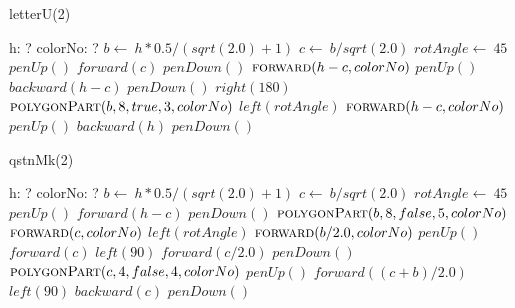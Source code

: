 \documentclass[a4paper,10pt]{article}
\begin{document}
\begin{algorithm}
\caption{letterU(2)}
\begin{algorithmic}[5]
\State {}
\State {}
    \State h: ?
    \State colorNo: ?
  \EndDecl
  \State \(b\gets\ h*0.5/(sqrt(2.0)+1)\)
  \State \(c\gets\ b/sqrt(2.0)\)
  \State \(rotAngle\gets\ 45\)
  \State \(penUp()\)
  \State \(forward(c)\)
  \State \(penDown()\)
  \State \(\Call{forward}{h-c,colorNo}\)
  \State \(penUp()\)
  \State \(backward(h-c)\)
  \State \(penDown()\)
  \State \(right(180)\)
  \State \(\Call{polygonPart}{b,8,true,3,colorNo}\)
  \State \(left(rotAngle)\)
  \State \(\Call{forward}{h-c,colorNo}\)
  \State \(penUp()\)
  \State \(backward(h)\)
  \State \(penDown()\)
\EndProcedure
\end{algorithmic}
\end{algorithm}


\begin{algorithm}
\caption{qstnMk(2)}
\begin{algorithmic}[5]
\State {}
\State {}
    \State h: ?
    \State colorNo: ?
  \EndDecl
  \State \(b\gets\ h*0.5/(sqrt(2.0)+1)\)
  \State \(c\gets\ b/sqrt(2.0)\)
  \State \(rotAngle\gets\ 45\)
  \State \(penUp()\)
  \State \(forward(h-c)\)
  \State \(penDown()\)
  \State {}
  \State {}
  \State \(\Call{polygonPart}{b,8,false,5,colorNo}\)
  \State \(\Call{forward}{c,colorNo}\)
  \State \(left(rotAngle)\)
  \State \(\Call{forward}{b/2.0,colorNo}\)
  \State \(penUp()\)
  \State \(forward(c)\)
  \State \(left(90)\)
  \State \(forward(c/2.0)\)
  \State \(penDown()\)
  \State {}
  \State {}
  \State \(\Call{polygonPart}{c,4,false,4,colorNo}\)
  \State \(penUp()\)
  \State \(forward((c+b)/2.0)\)
  \State \(left(90)\)
  \State \(backward(c)\)
  \State \(penDown()\)
\EndProcedure
\end{algorithmic}
\end{algorithm}
\end{document}
